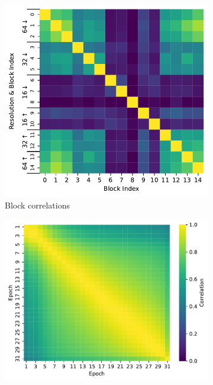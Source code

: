\begin{figure}
\centering
\begin{subfigure}{0.4452\columnwidth}
    \centering
    \includegraphics[width=\columnwidth]{img/4-experiments/heatmap_correlations.pdf}
    \caption{Block correlations}
    \label{fig:block-correlation}
\end{subfigure}
\begin{subfigure}{0.545\columnwidth}
    \centering
    \includegraphics[width=\columnwidth]{img/4-experiments/epoch_correlations.pdf}

\end{subfigure}
\end{figure}

